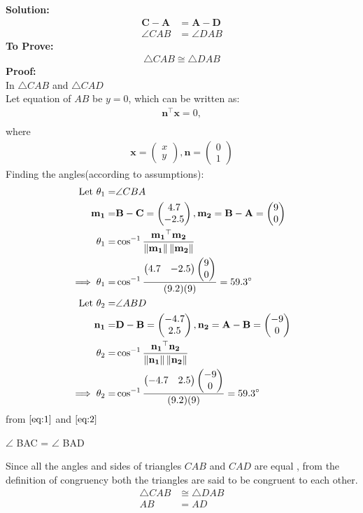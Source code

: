\documentclass{article}
\providecommand{\norm}[1]{\left\lVert#1\right\rVert}
\newcommand{\solution}{\noindent \textbf{Solution: }}
\newcommand{\myvec}[1]{\ensuremath{\begin{pmatrix}#1\end{pmatrix}}}
\let\vec\mathbf
\begin{document}
\solution
\begin{align}
	\vec{C}-\vec{A} &= \vec{A}-\vec{D}\\
	\angle{CAB} &= \angle{DAB}
\end{align}
\textbf{To Prove:}
	\begin{align}
		\triangle{CAB} \cong \triangle{DAB}
	\end{align}
\textbf{Proof:}\\
In $\triangle{CAB}$ and $\triangle{CAD}$\\
Let  equation of $AB$ be $y = 0$, which can be written as:
\begin{align}
	\vec{n}^{\top}\vec{x} = 0,\\
\end{align}
where
\begin{align}
\vec{x} = \myvec{x\\y},\vec{n} = \myvec{0\\1}
\end{align}
	Finding the angles(according to assumptions):
		\begin{align}
\text{Let }\theta_1=&\angle CBA\\
\vec{m_1}=&\vec{B}-\vec{C}=\myvec{4.7\\-2.5}, \vec{m_2}=\vec{B}-\vec{A}=\myvec{9\\0}\\
\theta_1=&\cos^{-1}\frac{\vec{m_1}^\top\vec{m_2}}{\norm{\vec{m_1}}\norm{\vec{m_2}}}\\
\implies\theta_1=&\cos^{-1}\frac{\myvec{4.7&-2.5}\myvec{9\\0}}{(9.2)(9)}=59.3\degree
\label{eq:1}\\
\text{Let }\theta_2=&\angle ABD\\
\vec{n_1}=&\vec{D}-\vec{B}=\myvec{-4.7\\2.5}, \vec{n_2}=\vec{A}-\vec{B}=\myvec{-9\\0}\\
\theta_2 =& \cos^{-1}\frac{\vec{n_1}^\top\vec{n_2}}{\norm{\vec{n_1}}\norm{\vec{n_2}}}\\
\implies\theta_2=&\cos^{-1}\frac{\myvec{-4.7&2.5}\myvec{-9\\0}}{(9.2)(9)}=59.3\degree
\label{eq:2}\\
\end{align}
from $\eqref{eq:1}$ and $\eqref{eq:2}$
\begin{center}
$\angle$ BAC = $\angle$ BAD 
\end{center}
Since all the angles and sides of triangles $CAB$ and $CAD$ are equal , from the definition of congruency both the triangles are said to be congruent to each other.
\begin{align}
	\triangle{CAB} &\cong \triangle{DAB}\\
	AB &= AD 
\end{align}
\end{document}
